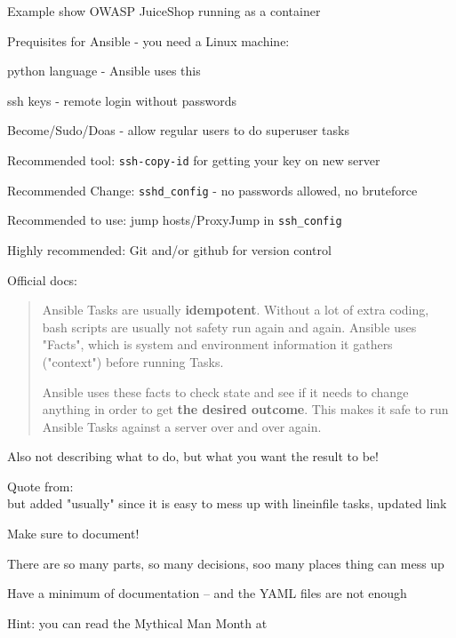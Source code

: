 \documentclass[Screen16to9,17pt]{foils}
\begin{document}
Example show OWASP JuiceShop running as a container


Prequisites for Ansible - you need a Linux machine:
\begin{list2}
\item python language - Ansible uses this
\item ssh keys - remote login without passwords
\item Become/Sudo/Doas - allow regular users to do superuser tasks
\item Recommended tool: \verb+ssh-copy-id+ for getting your key on new server
\item Recommended Change: \verb+sshd_config+ - no passwords allowed, no bruteforce
\item Recommended to use: jump hosts/ProxyJump in \verb+ssh_config+
\item Highly recommended: Git and/or github for version control
\end{list2}

Official docs:\\



\begin{quote}
Ansible Tasks are usually {\bf idempotent}. Without a lot of extra coding, bash scripts are usually not safety run again and again. Ansible uses "Facts", which is system and environment information it gathers ("context") before running Tasks.

Ansible uses these facts to check state and see if it needs to change anything in order to get {\bf the desired outcome}. This makes it safe to run Ansible Tasks against a server over and over again.
\end{quote}

Also not describing what to do, but what you want the result to be!

Quote from:\\
 but added "usually" since it is easy to mess up with lineinfile tasks, updated link 



\begin{list2}
\item Make sure to document!
\item There are so many parts, so many decisions, soo many places thing can mess up
\item Have a minimum of documentation -- and the YAML files are not enough
\item Hint:  you can read the Mythical Man Month at 
\end{list2}
\end{document}
